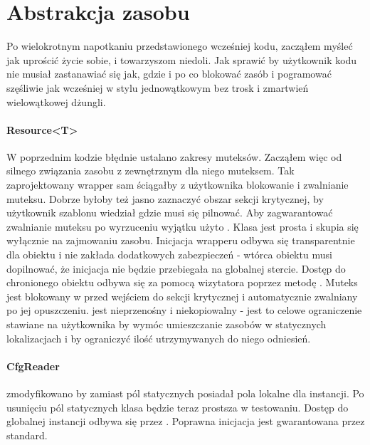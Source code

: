 \section{Abstrakcja zasobu}\label{sec:resource}
Po wielokrotnym napotkaniu przedstawionego wcześniej kodu, zacząłem myśleć jak uprościć życie sobie, i towarzyszom niedoli. Jak sprawić by użytkownik kodu nie musiał zastanawiać się jak, gdzie i po co blokować zasób i pogramować szęśliwie jak wcześniej w stylu jednowątkowym bez trosk i zmartwień wielowątkowej dżungli.

\paragraph{Resource<T>}
W poprzednim kodzie błędnie ustalano zakresy muteksów. Zacząłem więc od silnego związania zasobu z zewnętrznym dla niego muteksem. Tak zaprojektowany wrapper sam ściągałby z użytkownika blokowanie i zwalnianie muteksu. Dobrze byłoby też jasno zaznaczyć obszar sekcji krytycznej, by użytkownik szablonu wiedział gdzie musi się pilnować. Aby zagwarantować zwalnianie muteksu po wyrzuceniu wyjątku użyto . 
Klasa jest prosta i skupia się wyłącznie na zajmowaniu zasobu. Inicjacja wrapperu odbywa się transparentnie dla obiektu i nie zakłada dodatkowych zabezpieczeń - wtórca obiektu musi dopilnować, że inicjacja nie będzie przebiegała na globalnej stercie. Dostęp do chronionego obiektu odbywa się za pomocą wizytatora poprzez metodę . Muteks jest blokowany w przed wejściem do sekcji krytycznej i automatycznie zwalniany po jej opuszczeniu.
 jest nieprzenośny i niekopiowalny - jest to celowe ograniczenie stawiane na użytkownika by wymóc umieszczanie zasobów w statycznych lokalizacjach i by ograniczyć ilość utrzymywanych do niego odniesień.

\paragraph{CfgReader}
 zmodyfikowano by zamiast pól statycznych posiadał pola lokalne dla instancji. Po usunięciu pól statycznych klasa będzie teraz prostsza w testowaniu. Dostęp do globalnej instancji odbywa się przez . Poprawna inicjacja jest gwarantowana przez standard.

